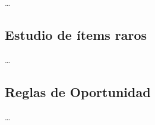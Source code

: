 \ldots

\subsection{Estudio de ítems raros}

\ldots



\subsection{Reglas de Oportunidad}
\ldots







